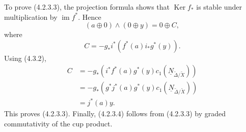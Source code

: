To prove (4.2.3.3), the projection formula shows that
$\operatorname{Ker}f_*$ is stable under multiplication by
$\operatorname{im}f^*$.  Hence
\[
(a\oplus0)\wedge(0\oplus y)=0\oplus C,
\]
where
\begin{equation}\tag{4.3.3}
C=-g_*i^*\!\left(f^*(a)i_*g^*(y)\right).
\end{equation}
Using (4.3.2),
\[
\begin{aligned}
C
&=-g_*\!\left(i^*f^*(a)g^*(y)
      c_1(\underline N_{\widetilde\Delta/\widetilde X})\right)\\
&=-g_*\!\left(g^*j^*(a)g^*(y)
      c_1(\underline N_{\widetilde\Delta/\widetilde X})\right)\\
&=j^*(a)y.
\end{aligned}
\]
This proves (4.2.3.3).  Finally, (4.2.3.4) follows from (4.2.3.3) by graded
commutativity of the cup product.
